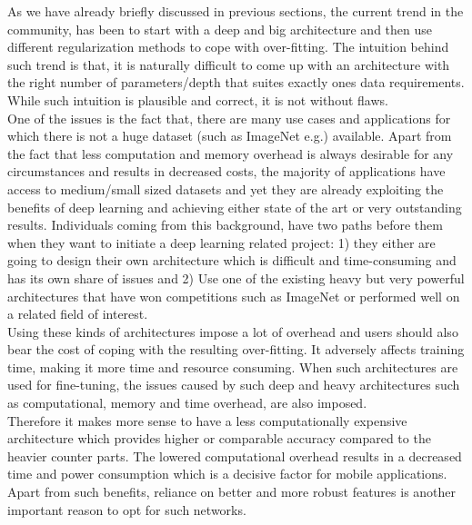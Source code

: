 \documentclass{article} \usepackage{lets_keepit_simple,times}
\begin{document}
As we have already briefly discussed in previous sections, the current trend in the community, has been to start with a deep and big architecture and then use different regularization methods to cope with over-fitting. The intuition behind such trend is that, it is naturally difficult to come up with an architecture with the right number of parameters/depth that suites exactly ones data requirements. While such intuition is plausible and correct, it is not without flaws.\\
One of the issues is the fact that, there are many use cases and applications for which there is not a huge dataset (such as ImageNet e.g.) available. Apart from the fact that less computation and memory overhead is always desirable for any circumstances and results in decreased costs, the majority of applications have access to medium/small sized datasets and yet they are already exploiting the benefits of deep learning and achieving either state of the art or very outstanding results. Individuals coming from this background, have two paths before them when they want to initiate a deep learning related project: 1) they either are going to design their own architecture which is difficult and time-consuming and has its own share of issues and 2) Use one of the existing heavy but very powerful architectures that have won competitions such as ImageNet or performed well on a related field of interest.\\
Using these kinds of architectures impose a lot of overhead and users should also bear the cost of coping with the resulting over-fitting. It adversely affects training time, making it more time and resource consuming. When such architectures are used for fine-tuning, the issues caused by such deep and heavy architectures such as computational, memory and time overhead, are also imposed.\\ 
Therefore it makes more sense to have a less computationally expensive architecture which provides higher or comparable accuracy compared to the heavier counter parts. The lowered computational overhead results in a decreased time and power consumption which is a decisive factor for mobile applications. Apart from such benefits, reliance on better and more robust features is another important reason to opt for such networks.
\end{document}
